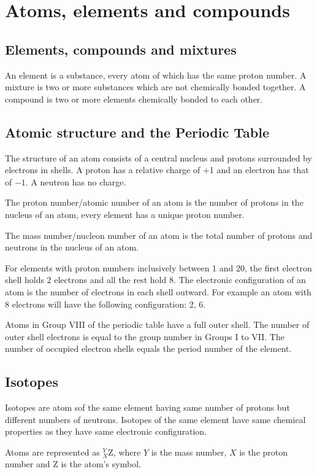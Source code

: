 \section{Atoms, elements and compounds}
\subsection{Elements, compounds and mixtures}
An element is a substance, every atom of which has the same proton number. A mixture is two or
more substances which are not chemically bonded together. A compound is two or more elements
chemically bonded to each other.

\subsection{Atomic structure and the Periodic Table}
The structure of an atom consists of a central nucleus and protons surrounded by electrons in 
shells. A proton has a relative charge of +1 and an electron has that of $-1$. A neutron has
no charge.

The proton number/atomic number of an atom is the number of protons in the nucleus of an atom, every element
has a unique proton number.

The mass number/nucleon number of an atom is the total number of protons and neutrons in the 
nucleus of an atom.

For elements with proton numbers inclusively between 1 and 20, the first electron shell holds 2
electrons and all the rest hold 8. The electronic configuration of an atom is the number of 
electrons in each shell outward. For example an atom with 8 electrons will have the following
configuration: 2, 6.

Atoms in Group VIII of the periodic table have a full outer shell. The number of outer shell 
electrons is equal to the group number in Groups I to VII. The number of occupied electron shells
equals the period number of the element.

\subsection{Isotopes}
Isotopes are atom sof the same element having same number of protons but different numbers of
neutrons. Isotopes of the same element have same chemical properties as they have same
electronic configuration. 

Atoms are represented as $^Y_X$Z, where $Y$ is the mass number, $X$ is the proton number and Z
is the atom's symbol.


